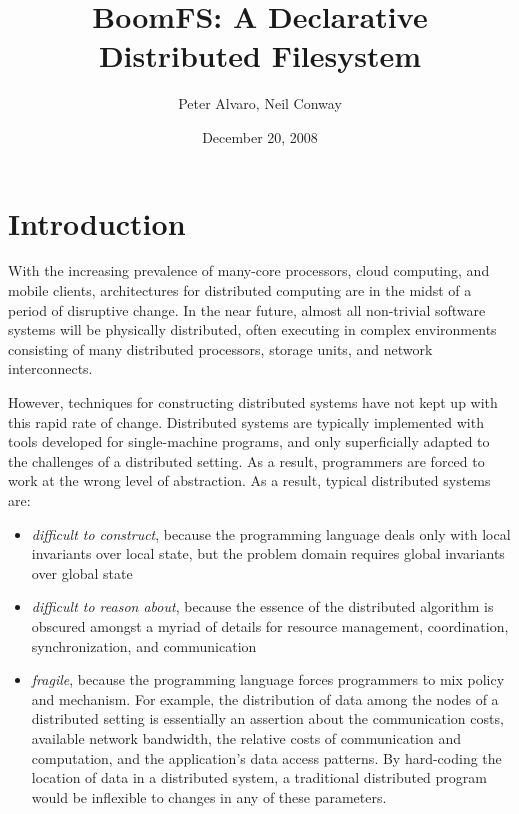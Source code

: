 \documentclass{article}
\title{BoomFS: A Declarative Distributed Filesystem}
\author{Peter Alvaro, Neil Conway}
\date{December 20, 2008}
\begin{document}
\maketitle
\begin{abstract}
\end{abstract}

\section{Introduction}
With the increasing prevalence of many-core processors, cloud computing,
and mobile clients, architectures for distributed computing are in the
midst of a period of disruptive change. In the near future, almost all
non-trivial software systems will be physically distributed, often
executing in complex environments consisting of many distributed
processors, storage units, and network interconnects.

However, techniques for constructing distributed systems have not kept
up with this rapid rate of change. Distributed systems are typically
implemented with tools developed for single-machine programs, and only
superficially adapted to the challenges of a distributed setting. As a
result, programmers are forced to work at the wrong level of
abstraction. As a result, typical distributed systems are:
\begin{itemize}
\item \emph{difficult to construct}, because the programming language
  deals only with local invariants over local state, but the problem
  domain requires global invariants over global state

\item \emph{difficult to reason about}, because the essence of the
  distributed algorithm is obscured amongst a myriad of details for
  resource management, coordination, synchronization, and
  communication

\item
  \emph{fragile}, because the programming language forces programmers
  to mix policy and mechanism. For example, the distribution of data
  among the nodes of a distributed setting is essentially an assertion
  about the communication costs, available network bandwidth, the
  relative costs of communication and computation, and the
  application's data access patterns. By hard-coding the location of
  data in a distributed system, a traditional distributed program
  would be inflexible to changes in any of these parameters.
\end{itemize}
\end{document}
